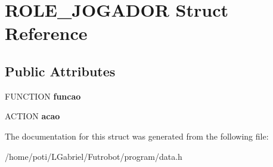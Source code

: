 \hypertarget{structROLE__JOGADOR}{}\section{R\+O\+L\+E\+\_\+\+J\+O\+G\+A\+D\+OR Struct Reference}
\label{structROLE__JOGADOR}
\subsection*{Public Attributes}
\begin{DoxyCompactItemize}
\item 
F\+U\+N\+C\+T\+I\+ON {\bfseries funcao}\hypertarget{structROLE__JOGADOR_a1f2853194b0d60c2320217b048352d92}{}\label{structROLE__JOGADOR_a1f2853194b0d60c2320217b048352d92}

\item 
A\+C\+T\+I\+ON {\bfseries acao}\hypertarget{structROLE__JOGADOR_ae1471c84082ad2ed5bb3d48a83988c18}{}\label{structROLE__JOGADOR_ae1471c84082ad2ed5bb3d48a83988c18}

\end{DoxyCompactItemize}


The documentation for this struct was generated from the following file\+:\begin{DoxyCompactItemize}
\item 
/home/poti/\+L\+Gabriel/\+Futrobot/program/data.\+h\end{DoxyCompactItemize}
